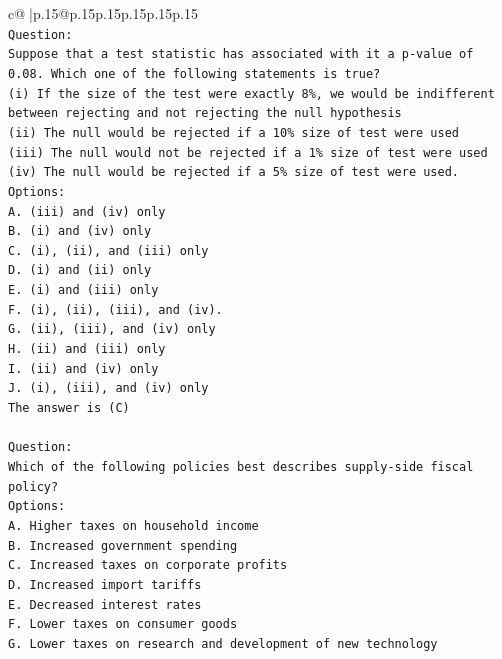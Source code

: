 \documentclass{article}
\begin{document}
{\begin{supertabular}{c@{$\;$}|p{.15\linewidth}@{}p{.15\linewidth}p{.15\linewidth}p{.15\linewidth}p{.15\linewidth}p{.15\linewidth}}
{{{\\ 
\texttt{Question:} \\
\texttt{Suppose that a test statistic has associated with it a p{-}value of 0.08. Which one of the following statements is true?} \\
\texttt{(i) If the size of the test were exactly 8\%, we would be indifferent between rejecting and not rejecting the null hypothesis} \\
\texttt{(ii) The null would be rejected if a 10\% size of test were used} \\
\texttt{(iii) The null would not be rejected if a 1\% size of test were used} \\
\texttt{(iv) The null would be rejected if a 5\% size of test were used.} \\
\texttt{Options:} \\
\texttt{A. (iii) and (iv) only} \\
\texttt{B. (i) and (iv) only} \\
\texttt{C. (i), (ii), and (iii) only} \\
\texttt{D. (i) and (ii) only} \\
\texttt{E. (i) and (iii) only} \\
\texttt{F. (i), (ii), (iii), and (iv).} \\
\texttt{G. (ii), (iii), and (iv) only} \\
\texttt{H. (ii) and (iii) only} \\
\texttt{I. (ii) and (iv) only} \\
\texttt{J. (i), (iii), and (iv) only} \\
\texttt{The answer is (C)} \\
\\ 
\texttt{Question:} \\
\texttt{Which of the following policies best describes supply{-}side fiscal policy?} \\
\texttt{Options:} \\
\texttt{A. Higher taxes on household income} \\
\texttt{B. Increased government spending} \\
\texttt{C. Increased taxes on corporate profits} \\
\texttt{D. Increased import tariffs} \\
\texttt{E. Decreased interest rates} \\
\texttt{F. Lower taxes on consumer goods} \\
\texttt{G. Lower taxes on research and development of new technology} \\
}}}
\end{supertabular}}
\end{document}
